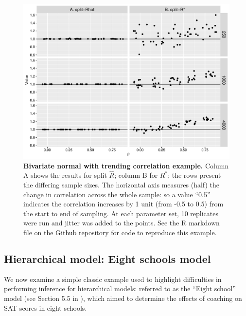 \documentclass{article}
\begin{document}
\begin{figure}[!htb]
	\centerline{\includegraphics[width=1.0\textwidth]{../output/trends_joint_distribution.pdf}}
	\caption{\textbf{Bivariate normal with trending correlation example.} Column A shows the results for split-$\widehat{R}$; column B for $R^*$; the rows present the differing sample sizes. The horizontal axis measures (half) the change in correlation across the whole sample: so a value ``0.5'' indicates the correlation increases by 1 unit (from -0.5 to 0.5) from the start to end of sampling. At each parameter set, 10 replicates were run and jitter was added to the points. See the R markdown file on the Github repository for code to reproduce this example.}
	\label{fig:trends_joint_distribution}
\end{figure}


\subsection{Hierarchical model: Eight schools model}\label{sec:eight_shools}
We now examine a simple classic example used to highlight difficulties in performing inference for hierarchical models: referred to as the ``Eight school'' model (see Section 5.5 in \citep{gelman2013bayesian}), which aimed to determine the effects of coaching on SAT scores in eight schools. 
\end{document}
